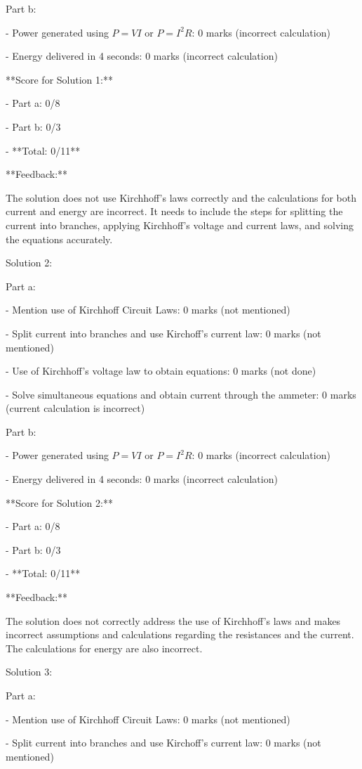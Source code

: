 \documentclass[a4paper,11pt]{article}
\begin{document}
Part b:

- Power generated using \( P = VI \) or \( P = I^2 R \): 0 marks (incorrect calculation)

- Energy delivered in 4 seconds: 0 marks (incorrect calculation)

**Score for Solution 1:**

- Part a: 0/8

- Part b: 0/3

- **Total: 0/11**

**Feedback:**

The solution does not use Kirchhoff's laws correctly and the calculations for both current and energy are incorrect. It needs to include the steps for splitting the current into branches, applying Kirchhoff’s voltage and current laws, and solving the equations accurately.

Solution 2:

Part a:

- Mention use of Kirchhoff Circuit Laws: 0 marks (not mentioned)

- Split current into branches and use Kirchoff’s current law: 0 marks (not mentioned)

- Use of Kirchhoff’s voltage law to obtain equations: 0 marks (not done)

- Solve simultaneous equations and obtain current through the ammeter: 0 marks (current calculation is incorrect)

Part b:

- Power generated using \( P = VI \) or \( P = I^2 R \): 0 marks (incorrect calculation)

- Energy delivered in 4 seconds: 0 marks (incorrect calculation)

**Score for Solution 2:**

- Part a: 0/8

- Part b: 0/3

- **Total: 0/11**

**Feedback:**

The solution does not correctly address the use of Kirchhoff's laws and makes incorrect assumptions and calculations regarding the resistances and the current. The calculations for energy are also incorrect.

Solution 3:

Part a:

- Mention use of Kirchhoff Circuit Laws: 0 marks (not mentioned)

- Split current into branches and use Kirchoff’s current law: 0 marks (not mentioned)
\end{document}

